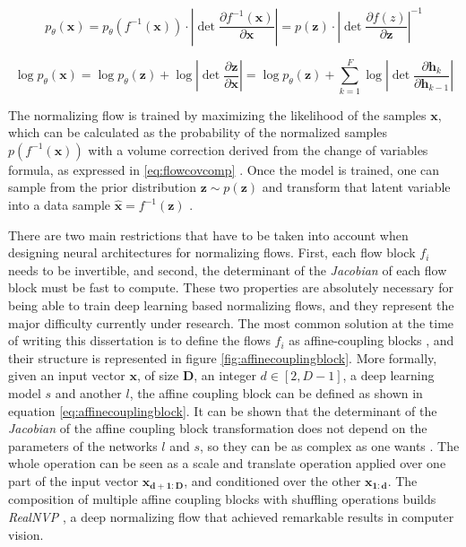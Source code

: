 \begin{equation}
\label{eq:flowcov}
p_\theta(\mathbf{x}) = p_\theta(f^{-1}(\mathbf{x})) \cdot \left| \det \frac{\partial f^{-1}(\mathbf{x})}{\partial \mathbf{x}} \right| = p(\mathbf{z}) \cdot \left| \det \frac{\partial f(z)}{\partial \mathbf{z}} \right|^{-1}
\end{equation}


\begin{equation}
\label{eq:flowcovcomp}
\log p_\theta(\mathbf{x}) 
= \log p_\theta(\mathbf{z}) + \log  \left| \det \frac{\partial \mathbf{z}}{\partial \mathbf{x}} \right| 
= \log p_\theta(\mathbf{z}) + \sum_{k=1}^{F} \log  \left| \det \frac{\partial \mathbf{h}_k}{\partial \mathbf{h}_{k-1}} \right| 
\end{equation}


The normalizing flow is trained by maximizing the likelihood of the samples $\mathbf{x}$, which can be calculated as the probability of the normalized samples $p(f^{-1}(\mathbf{x}))$ with a volume correction derived from the change of variables formula, as expressed in \ref{eq:flowcovcomp} \autocite{papamakarios2017}. Once the model is trained, one can sample from the prior distribution $\mathbf{z} \sim p(\mathbf{z})$ and transform that latent variable into a data sample $\hat{\mathbf{x}} = f^{-1}(\mathbf{z})$ \autocite{rezende2015}.

There are two main restrictions that have to be taken into account when designing neural architectures for normalizing flows. First, each flow block $f_i$ needs to be invertible, and second, the determinant of the \textit{Jacobian} of each flow block must be fast to compute. These two properties are absolutely necessary for being able to train deep learning based normalizing flows, and they represent the major difficulty currently under research. The most common solution at the time of writing this dissertation is to define the flows $f_i$ as affine-coupling blocks \autocite{dinh2018}, and their structure is represented in figure \ref{fig:affinecouplingblock}. More formally, given an input vector $\mathbf{x}$, of size $\mathbf{D}$, an integer $d \in [2,D-1]$, a deep learning model $s$ and another $l$, the affine coupling block can be defined as shown in equation \ref{eq:affinecouplingblock}. It can be shown that the determinant of the \textit{Jacobian} of the affine coupling block transformation does not depend on the parameters of the networks $l$ and $s$, so they can be as complex as one wants \autocite{dinh2018}. The whole operation can be seen as a scale and translate operation applied over one part of the input vector $\mathbf{x_{d+1:D}}$, and conditioned over the other $\mathbf{x_{1:d}}$. The composition of multiple affine coupling blocks with shuffling operations builds \textit{RealNVP} \autocite{dinh2018}, a deep normalizing flow that achieved remarkable results in computer vision.

